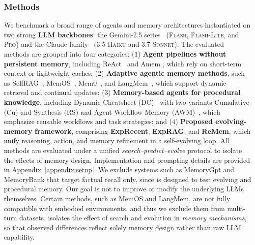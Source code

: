 \subsubsection{Methods}
We benchmark a broad range of agents and memory architectures instantiated on two strong \textbf{LLM backbones}: the Gemini-2.5 series~\citep{comanici2025gemini} (\textsc{Flash}, \textsc{Flash-Lite}, and \textsc{Pro}) and the Claude family~\citep{anthropic_claude4_2025} (\textsc{3.5-Haiku} and \textsc{3.7-Sonnet}).
The evaluated methods are grouped into four categories:  
(1) \textbf{Agent pipelines without persistent memory}, including ReAct~\citep{yao2022react} and Amem \citep{xu2025mem}, which rely on short-term context or lightweight caches;  
(2) \textbf{Adaptive agentic memory methods}, such as SelfRAG~\citep{asai2024self}, MemOS~\citep{Li2025MemOSAO}, Mem0~\citep{mem0}, and LangMem~\citep{langchain}, which support dynamic retrieval and continual updates;  
(3) \textbf{Memory-based agents for procedural knowledge}, including Dynamic Cheatsheet (DC)~\citep{suzgun2025dynamic} with two variants Cumulative (Cu) and Synthesis (RS) and Agent Workflow Memory (AWM)~\citep{Wang2024AgentWM}, which emphasize reusable workflows and task strategies; and  
(4) \textbf{Proposed evolving-memory framework}, comprising \textbf{ExpRecent}, \textbf{ExpRAG}, and \textbf{ReMem}, which unify reasoning, action, and memory refinement in a self-evolving loop.  
All methods are evaluated under a unified \emph{search–predict–evolve} protocol to isolate the effects of memory design. Implementation and prompting details are provided in Appendix~\ref{appendix:setup}. We exclude systems such as MemoryGpt \citep{Zhong2023MemoryBankEL} and MemoryBank \citep{Zhong2023MemoryBankEL} that target factual recall only, since \method is designed to test evolving and procedural memory.  Our goal is not to improve or modify the underlying LLMs themselves. Certain methods, such as MemOS and LangMem, are not fully compatible with embodied environments, and thus we exclude them from multi-turn datasets. \method isolates the effect of search and evolution in \emph{memory mechanisms}, so that observed differences reflect solely memory design rather than raw LLM capability.









